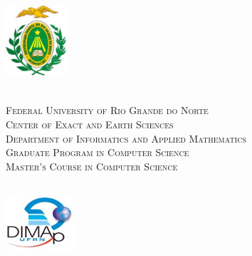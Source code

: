 
\begin{titlepage}
	\begin{center}
		
		\begin{minipage}{2.3cm}
			\begin{center}
				\includegraphics[width=2.25cm, height=2.68cm]{Imagens/Brasao-UFRN.jpg}
			\end{center}
		\end{minipage}
		\begin{minipage}{11.15cm}
			\begin{center}
				\begin{espacosimples}
					{\small \ \\
                       \textsc{Federal University of Rio Grande do Norte}		   			\\
							  \textsc{Center of Exact and Earth Sciences}					\\
							  \textsc{Department of Informatics and Applied Mathematics}	   	\\
							  \textsc{Graduate Program in Computer Science}  	\\
							  \textsc{Master's Course in Computer Science}		\\
                       \textsc{}}   				\\
				\end{espacosimples}
			\end{center}
		\end{minipage}
		\begin{minipage}{2.3cm}
			\begin{center}
				\includegraphics[width=2.52cm, height=1.96cm]{Imagens/DIMAp.jpg}
			\end{center}
		\end{minipage}
			

\end{center}
\end{titlepage}
